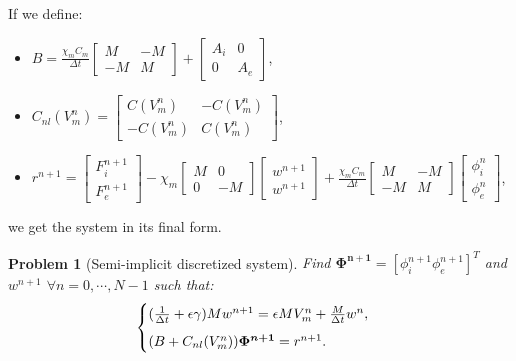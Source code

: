 \documentclass[a4paper,11pt]{article}
\newtheorem{problem}{Problem}
\begin{document}
\vspace{5mm}
\noindent If we define:
\begin{itemize}
\item $B=\frac{\chi_m C_m}{\Delta t} \begin{bmatrix} M &-M \\-M & M \end{bmatrix}+\begin{bmatrix} A_i & 0 \\ 0 & A_e \end{bmatrix}$,
\item $C_{nl}(V_m^n)=\begin{bmatrix}C(V_m^n) & -C(V_m^n) \\ -C(V_m^n) & C(V_m^n) \end{bmatrix}$,
\item $r^{n+1}=\begin{bmatrix} F_i^{n+1} \\ F_e^{n+1}\end{bmatrix}-\chi_m \begin{bmatrix}M & 0 \\ 0 & -M \end{bmatrix} \begin{bmatrix}w^{n+1} \\ w^{n+1} \end{bmatrix}+\frac{\chi_m C_m}{\Delta t} \begin{bmatrix} M &-M \\-M & M \end{bmatrix} \begin{bmatrix} \phi_i^n \\ \phi_e^n \end{bmatrix}$,
\end{itemize} \vspace{5mm}
we get the system in its final form.  \\
\begin{problem}[Semi-implicit discretized system]
Find $\bm{\Phi^{n+1}}=[\phi_i^{n+1} \phi_e^{n+1}]^T$ and $w^{n+1}$ $\forall n=0,\cdots,N-1$ such that:
\begin{equation}\label{SI-system}
\begin{cases}
(\frac{1}{\Delta t}+\epsilon \gamma)M w^{n+1}=\epsilon M V_m^n+\frac{M}{\Delta t} w^n, \vspace{2mm} \\
(B+C_{nl}(V_m^n)) \bm{\Phi^{n+1}}=r^{n+1}.
\end{cases}
\end{equation} 
\end{problem}
\end{document}
